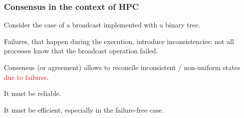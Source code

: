\begin{frame}
  \frametitle{Consensus in the context of HPC}

  Consider the case of a broadcast implemented with a binary tree.


      Failures, that happen during the execution, introduce
      inconsistencies: not all processes know that the broadcast
      operation failed.

      \begin{center}
      Consensus (or agreement) allows to reconcile inconsistent /
      non-uniform states \textcolor{red}{due to failures}.

      It must be \textcolor{green!65!black}{reliable}.

      It must be \textcolor{green!65!black}{efficient}, especially in
      the \textcolor{green!65!black}{failure-free} case.
      \end{center}

\end{frame}

